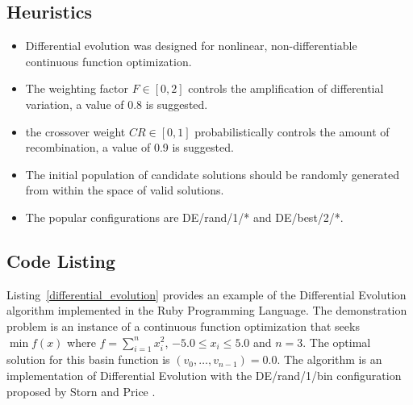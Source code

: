 \subsection{Heuristics}
\begin{itemize}
	\item Differential evolution was designed for nonlinear, non-differentiable continuous function optimization.
	\item The weighting factor $F \in [0,2]$ controls the amplification of differential variation, a value of 0.8 is suggested.
	\item the crossover weight $CR \in [0,1]$ probabilistically controls the amount of recombination, a value of 0.9 is suggested.
	\item The initial population of candidate solutions should be randomly generated from within the space of valid solutions.
	\item The popular configurations are DE/rand/1/* and DE/best/2/*. 
\end{itemize}

\subsection{Code Listing}
Listing~\ref{differential_evolution} provides an example of the Differential Evolution algorithm implemented in the Ruby Programming Language.
The demonstration problem is an instance of a continuous function optimization that seeks $\min f(x)$ where $f=\sum_{i=1}^n x_{i}^2$, $-5.0\leq x_i \leq 5.0$ and $n=3$. The optimal solution for this basin function is $(v_0,\ldots,v_{n-1})=0.0$.
The algorithm is an implementation of Differential Evolution with the DE/rand/1/bin configuration proposed by Storn and Price \cite{Storn1997}.

